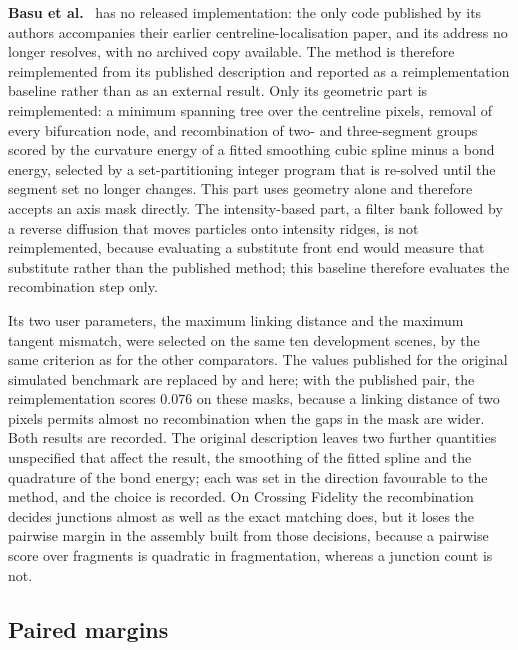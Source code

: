 \textbf{Basu et al.}\ \citep{basu2015extraction} has no released implementation: the only code published
by its authors accompanies their earlier centreline-localisation paper, and its
address no longer resolves, with no archived copy available. The method is
therefore reimplemented from its published description and reported as a
reimplementation baseline rather than as an external result. Only its
geometric part is reimplemented: a minimum spanning tree over the centreline
pixels, removal of every bifurcation node, and recombination of two- and
three-segment groups scored by the curvature energy of a fitted smoothing cubic
spline \citep{dierckx1993curve} minus a bond energy, selected by a
set-partitioning integer program that is re-solved until the segment set no
longer changes. This part uses geometry alone and therefore accepts an axis
mask directly. The intensity-based part, a filter bank followed by a reverse
diffusion that moves particles onto intensity ridges, is not reimplemented,
because evaluating a substitute front end would measure that substitute rather
than the published method; this baseline therefore evaluates the recombination
step only.

Its two user parameters, the maximum linking distance and the maximum tangent
mismatch, were selected on the same ten development scenes, by the same
criterion as for the other comparators. The values published for the original
simulated benchmark are replaced by \PlectaBasuDelta{} and \PlectaBasuTheta{}
here; with the published pair, the reimplementation scores 0.076 on these
masks, because a linking distance of two pixels permits almost no
recombination when the gaps in the mask are wider. Both results are recorded.
The original description leaves two further quantities unspecified that affect
the result, the smoothing of the fitted spline and the quadrature of the bond
energy; each was set in the direction favourable to the method, and the choice
is recorded. On Crossing Fidelity the recombination decides junctions almost as
well as the exact matching does, but it loses the pairwise margin in the
assembly built from those decisions, because a pairwise score over fragments
is quadratic in fragmentation, whereas a junction count is not.

\subsection{Paired margins}


